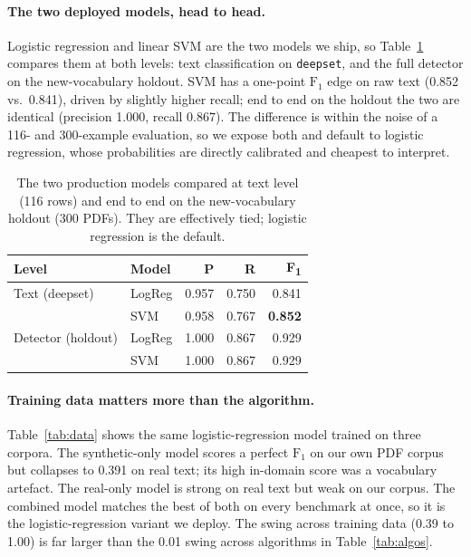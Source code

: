 \documentclass[11pt]{article}
\begin{document}
\paragraph{The two deployed models, head to head.}
Logistic regression and linear SVM are the two models we ship, so
Table~\ref{tab:twomodel} compares them at both levels: text classification on
\texttt{deepset}, and the full detector on the new-vocabulary holdout. SVM has a
one-point $\text{F}_1$ edge on raw text (0.852 vs.\ 0.841), driven by slightly
higher recall; end to end on the holdout the two are identical (precision 1.000,
recall 0.867). The difference is within the noise of a 116- and 300-example
evaluation, so we expose both and default to logistic regression, whose
probabilities are directly calibrated and cheapest to interpret.

\begin{table}[t]
  \centering
  \small
  \begin{tabular}{llrrr}
    \toprule
    \textbf{Level} & \textbf{Model} & \textbf{P} & \textbf{R} & \textbf{F\textsubscript{1}} \\
    \midrule
    Text (deepset)   & LogReg & 0.957 & 0.750 & 0.841 \\
                     & SVM    & 0.958 & 0.767 & \textbf{0.852} \\
    \midrule
    Detector (holdout) & LogReg & 1.000 & 0.867 & 0.929 \\
                       & SVM    & 1.000 & 0.867 & 0.929 \\
    \bottomrule
  \end{tabular}
  \caption{The two production models compared at text level (116 rows) and end
  to end on the new-vocabulary holdout (300 PDFs). They are effectively tied;
  logistic regression is the default.}
  \label{tab:twomodel}
\end{table}

\paragraph{Training data matters more than the algorithm.}
Table~\ref{tab:data} shows the same logistic-regression model trained on three
corpora. The synthetic-only model scores a perfect $\text{F}_1$ on our own PDF
corpus but collapses to 0.391 on real text; its high in-domain score was a
vocabulary artefact. The real-only model is strong on real text but weak on our
corpus. The combined model matches the best of both on every benchmark at once,
so it is the logistic-regression variant we deploy. The swing
across training data (0.39 to 1.00) is far larger than the 0.01 swing across
algorithms in Table~\ref{tab:algos}.
\end{document}
